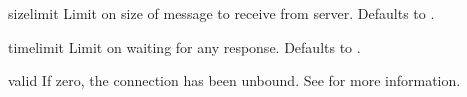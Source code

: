 \begin{datadesc}{sizelimit}
    Limit on size of message to receive from server. 
    Defaults to .
\end{datadesc}


\begin{datadesc}{timelimit}
    Limit on waiting for any response. 
    Defaults to .
\end{datadesc}


\begin{datadesc}{valid}
    If zero, the connection has been unbound. See  for
    more information.
\end{datadesc}

